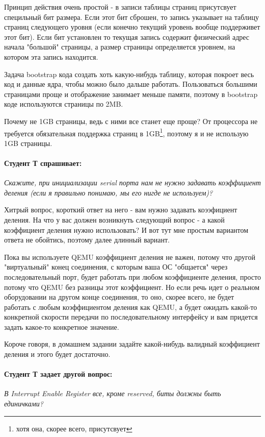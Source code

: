 Принцип действия очень простой - в записи таблицы страниц присутсвует специльный
бит размера. Если этот бит сброшен, то запись указывает на таблицу страниц
следующего уровня (если конечно текущий уровень вообще поддерживет этот бит).
Если бит установлен то текущая запись содержит физический адрес начала "большой"
страницы, а размер страницы определяется уровнем, на котором эта запись
находится.

Задача bootstrap кода создать хоть какую-нибудь таблицу, которая покроет весь
код и данные ядра, чтобы можно было дальше работать. Пользоваться большими
страницами проще и отображение занимает меньше памяти, поэтому в bootstrap коде
используются страницы по 2MB.

Почему не 1GB страницы, ведь с ними все станет еще проще? От процессора не
требуется обязательная поддержка страниц в 1GB\footnote{хотя она, скорее всего,
присутсвует}, поэтому я и не использую 1GB страницы.

\paragraph{Студент Т спрашивает:}\emph{Скажите, при инициализации serial порта
нам не нужно задавать коэффициент деления (если я правильно понимаю, мы его нигде не используем)?}

Хитрый вопрос, короткий ответ на него - вам нужно задавать коээфициент деления.
На что у вас должен возникнуть следующий вопрос - а какой коэффициент деления
нужно использовать? И вот тут мне простым вариантом ответа не обойтись, поэтому
далее длинный вариант.

Пока вы используете QEMU коэффициент деления не важен, потому что другой
"виртуальный" конец соединения, с которым ваша ОС "общается" через
последовательный порт, будет работать при любом коэффициенте деления, просто
потому что QEMU без разницы этот коэффициент. Но если речь идет о реальном
оборудовании на другом конце соединения, то оно, скорее всего, не будет работать
с любым коэффициентом деления как QEMU, а будет ожидать какой-то конкретной
скорости передачи по последовательному интерфейсу и вам придется задать какое-то
конкретное значение.

Короче говоря, в домашнем задании задайте какой-нибудь валидный коэффициент
деления и этого будет достаточно.

\paragraph{Студент Т задает другой вопрос:}\emph{В Interrupt Enable Register
все, кроме reserved, биты должны быть единичками?}


